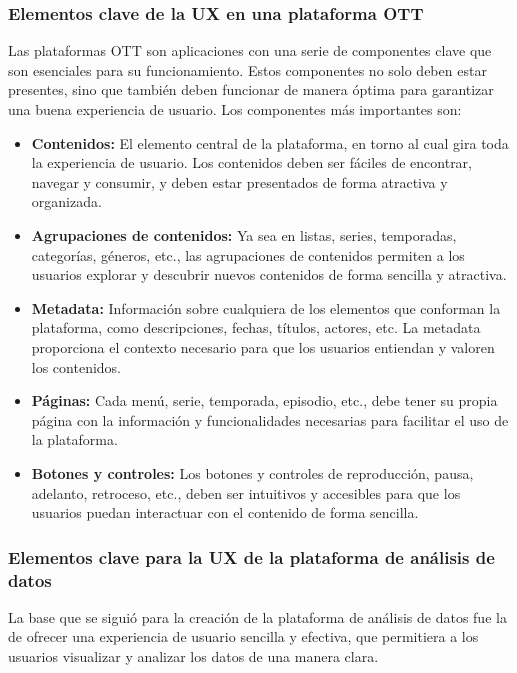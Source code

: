 \subsubsection{Elementos clave de la UX en una plataforma OTT}
\label{subsec:fundamentos_teoricos_ux_elementos}

Las plataformas OTT son aplicaciones con una serie de componentes clave que son esenciales para su funcionamiento. 
Estos componentes no solo deben estar presentes, sino que también deben funcionar de manera óptima para garantizar 
una buena experiencia de usuario. Los componentes más importantes son:

\begin{itemize}
    \item \textbf{Contenidos:} El elemento central de la plataforma, en torno al cual gira toda la experiencia de usuario. Los contenidos deben ser fáciles de encontrar, navegar y consumir, y deben estar presentados de forma atractiva y organizada.
    \item \textbf{Agrupaciones de contenidos:} Ya sea en listas, series, temporadas, categorías, géneros, etc., las agrupaciones de contenidos permiten a los usuarios explorar y descubrir nuevos contenidos de forma sencilla y atractiva.
    \item \textbf{Metadata:} Información sobre cualquiera de los elementos que conforman la plataforma, como descripciones, fechas, títulos, actores, etc. La metadata proporciona el contexto necesario para que los usuarios entiendan y valoren los contenidos.
    \item \textbf{Páginas:} Cada menú, serie, temporada, episodio, etc., debe tener su propia página con la información y funcionalidades necesarias para facilitar el uso de la plataforma.
    \item \textbf{Botones y controles:} Los botones y controles de reproducción, pausa, adelanto, retroceso, etc., deben ser intuitivos y accesibles para que los usuarios puedan interactuar con el contenido de forma sencilla.
\end{itemize}

\subsubsection{Elementos clave para la UX de la plataforma de análisis de datos}
\label{subsec:fundamentos_teoricos_ux_elementos_analisis}

La base que se siguió para la creación de la plataforma de análisis de datos fue la de ofrecer una experiencia de usuario
sencilla y efectiva, que permitiera a los usuarios visualizar y analizar los datos de una manera clara.

